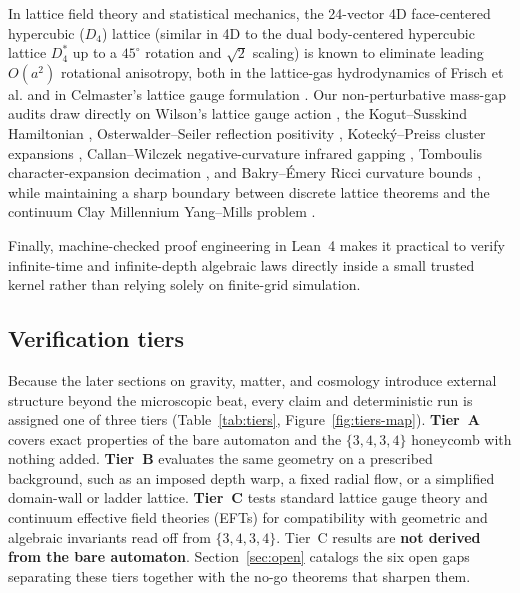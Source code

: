 In lattice field theory and statistical mechanics, the 24-vector 4D face-centered hypercubic ($D_4$) lattice (similar in
4D to the dual body-centered hypercubic lattice $D_4^*$ up to a $45^\circ$ rotation and $\sqrt{2}$ scaling) is known
to eliminate leading $O(a^2)$ rotational anisotropy, both in the lattice-gas hydrodynamics of Frisch et al.
\cite{frisch1987fchc} and in Celmaster's lattice gauge formulation \cite{celmaster1982}. Our non-perturbative mass-gap
audits draw directly on Wilson's lattice gauge action \cite{wilson1974}, the Kogut--Susskind Hamiltonian
\cite{kogut1975}, Osterwalder--Seiler reflection positivity \cite{osterwalder1978, seiler1982}, Koteck\'y--Preiss
cluster expansions \cite{kotecky1986}, Callan--Wilczek negative-curvature infrared gapping \cite{callan1990}, Tomboulis
character-expansion decimation \cite{tomboulis1983}, and Bakry--\'Emery Ricci curvature bounds \cite{bakry1985}, while
maintaining a sharp boundary between discrete lattice theorems and the continuum Clay Millennium Yang--Mills problem
\cite{jaffe2000ym}.

Finally, machine-checked proof engineering in Lean~4 \cite{demoura2021lean4} makes it practical to verify infinite-time
and infinite-depth algebraic laws directly inside a small trusted kernel rather than relying solely on finite-grid
simulation.

\subsection*{Verification tiers}

Because the later sections on gravity, matter, and cosmology introduce external structure beyond the microscopic beat,
every claim and deterministic run is assigned one of three tiers (Table~\ref{tab:tiers}, Figure~\ref{fig:tiers-map}).
\textbf{Tier~A} covers exact properties of the bare automaton and the $\{3,4,3,4\}$ honeycomb with nothing added.
\textbf{Tier~B} evaluates the same geometry on a prescribed background, such as an imposed depth warp, a fixed radial
flow, or a simplified domain-wall or ladder lattice. \textbf{Tier~C} tests standard lattice gauge theory and continuum
effective field theories (EFTs) for compatibility with geometric and algebraic invariants read off from $\{3,4,3,4\}$.
Tier~C results are \textbf{not derived from the bare automaton}. Section~\ref{sec:open} catalogs the six open gaps
separating these tiers together with the no-go theorems that sharpen them.

